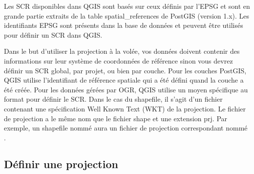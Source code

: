 Les SCR disponibles dans QGIS sont basés sur ceux définis par
l'EPSG et sont en grande partie extraits de la table
spatial\_references de PostGIS (version 1.x). Les identifiants
EPSG sont présents dans la base de données et peuvent être utilisés pour définir
un SCR dans QGIS. 

Dans le but d'utiliser la projection à la volée, vos données doivent contenir
des informations sur leur système de coordonnées de référence sinon vous devrez
définir un SCR global, par projet, ou bien par couche. Pour les couches
PostGIS, QGIS utilise l'identifiant de référence spatiale qui a été défini
quand la couche a été créée. Pour les données gérées par OGR, QGIS utilise un
moyen spécifique au format pour définir le SCR. Dans le cas du
shapefile, il s'agit d'un fichier contenant une spécification Well Known Text
(WKT) de la projection. Le fichier de projection a le même nom que
le fichier shape et une extension prj. Par exemple, un shapefile nommé
 aura un fichier de projection correspondant nommé
.

\subsection{Définir une projection}
\label{sec:projection-specifying}

